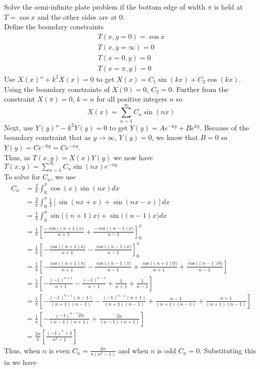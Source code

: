 \item [3.] Solve the semi-infinite plate problem if the bottom edge of width $\pi$ is held at $T = \cos{x}$ and the other sides are at 0\textdegree.\\[5mm]
Define the boundary constraints
\begin{align*}
    T(x,y=0)=\cos x\\
    T(x,y=\infty)=0\\
    T(x=0,y)=0\\
    T(x=\pi,y)=0
\end{align*}
Use $X(x)''+k^2X(x) = 0$ to get $X(x) = C_1\sin(kx)+C_2\cos(kx)$. Using the boundary constraints of $X(0) = 0$, $C_2 = 0$. Further from the constraint $X(\pi) = 0$, $k = n$ for all positive integers $n$ so 
\[\displaystyle X(x) = \sum_{n=1}^{\infty} C_n \sin\left(n x\right)\]
Next, use $Y(y)''-k^2Y(y)=0$ to get $Y(y) = Ae^{-ky}+Be^{ky}$. Because of the boundary constraint that as $y \rightarrow \infty$, $Y(y) = 0$, we know that $B = 0$ so $Y(y) = Ce^{-ky} = Ce^{-ny}$.\\[2mm]
Thus, as $T(x,y) = X(x)Y(y)$ we now have $\displaystyle T(x,y) = \sum_{n=1}^{\infty} C_n \sin\left(n x\right) e^{-ny}$\\[2mm]
To solve for $C_n$, we use \begin{align*}
    C_n &= \frac{2}{\pi} \int_0^{\pi} \cos(x)\sin\left(n x\right) dx \\
    &= \frac{2}{\pi} \int_0^{\pi} \frac{1}{2} [\sin(n x + x) + \sin(n x - x)] dx\\
    &= \frac{1}{\pi} \int_0^{\pi} \sin\big((n + 1)x\big) + \sin\big((n - 1) x\big) dx\\
    &= \frac{1}{\pi} \left[ \frac{-\cos\big((n + 1)x\big)}{n+1} + \frac{-\cos\big((n - 1)x\big)}{n-1} \right]_{0}^{\pi}\\
    &= \frac{1}{\pi} \left[ - \frac{\cos\big((n + 1)x\big)}{n+1} - \frac{\cos\big((n - 1)x\big)}{n-1} \right]_{0}^{\pi}\\
    &= \frac{1}{\pi} \left[ - \frac{\cos\big((n + 1)\pi\big)}{n+1} - \frac{\cos\big((n - 1)\pi\big)}{n-1} + \frac{\cos\big((n + 1)0\big)}{n+1} + \frac{\cos\big((n - 1)0\big)}{n-1}\right]\\
    &= \frac{1}{\pi} \left[ -\frac{(-1)^{n + 1}}{n+1} - \frac{(-1)^{n - 1}}{n-1} + \frac{1}{n+1} + \frac{1}{n-1}\right]\\
    &= \frac{1}{\pi} \left[ -\frac{(-1)^{n + 1}(n-1)}{(n+1)(n-1)} - \frac{(-1)^{n - 1}(n+1)}{(n+1)(n-1)} + \frac{n-1}{(n+1)(n-1)} + \frac{n+1}{(n+1)(n-1)}\right]\\
    &= \frac{1}{\pi} \left[ - \frac{(-1)^{n - 1}2n}{(n-1)(n+1)} + \frac{2n}{(n-1)(n+1)}\right]\\
    &= \frac{2n}{\pi} \left[ \frac{(-1)^{n}+1}{n^2-1} \right]
\end{align*}
Thus, when $n$ is even $C_n = \frac{4n}{\pi(n^2-1)}$ and when $n$ is odd $C_n = 0$.
Substituting this in we have
\answer{\[
    T(x,y) = \frac{4}{\pi}\sum_{\substack{n = 2 \\ \text{even } n}}^{\infty} \frac{n}{n^2-1} \sin\left(n x\right) e^{-ny}
\]}